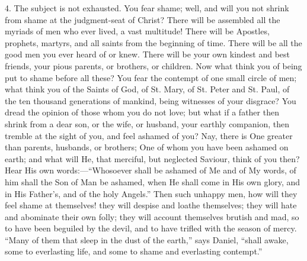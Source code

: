 4. The subject is not exhausted. You fear shame; well, and will you
not shrink from shame at the judgment-seat of Christ? There will be
assembled all the myriads of men who ever lived, a vast multitude!
There will be Apostles, prophets, martyrs, and all saints from the
beginning of time. There will be all the good men you ever heard of or
knew. There will be your own kindest and best friends, your pious
parents, or brothers, or children. Now what think you of being put to
shame before all these? You fear the contempt of one small circle of
men; what think you of the Saints of God, of St. Mary, of St. Peter
and St. Paul, of the ten thousand generations of mankind, being
witnesses of your disgrace? You dread the opinion of those whom you do
not love; but what if a father then shrink from a dear son, or the
wife, or husband, your earthly companion, then tremble at the sight of
you, and feel ashamed of you? Nay, there is One greater than parents,
husbands, or brothers; One of whom you have been ashamed on earth; and
what will He, that merciful, but neglected Saviour, think of you then?
Hear His own words:—``Whosoever shall be ashamed of Me and of My
words, of him shall the Son of Man be ashamed, when He shall come in
His own glory, and in His Father's, and of the holy Angels.'' Then
such unhappy men, how will they feel shame at themselves! they will
despise and loathe themselves; they will hate and abominate their own
folly; they will account themselves brutish and mad, so to have been
beguiled by the devil, and to have trifled with the season of mercy.
``Many of them that sleep in the dust of the earth,'' says
Daniel, ``shall awake, some to everlasting life, and some to shame
and everlasting contempt.''

